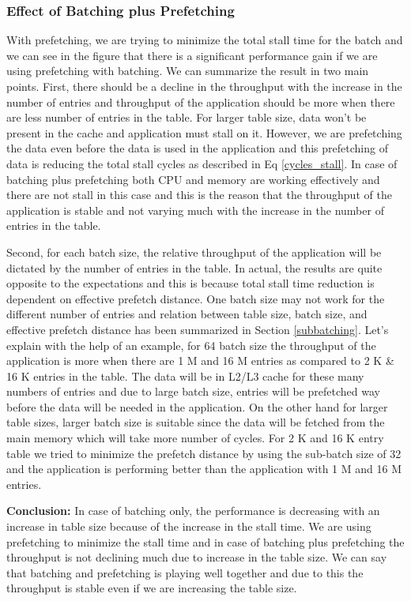 \subsubsection{Effect of Batching plus Prefetching}
\label{prefetchingsubsection}
With prefetching, we are trying to minimize the total stall time for the batch and we can see in the figure that there is a significant performance gain if we are using prefetching with batching. We can summarize the result in two main points. First, there should be a decline in the throughput with the increase in the number of entries and throughput of the application should be more when there are less number of entries in the table. For larger table size, data won't be present in the cache and application must stall on it. However, we are prefetching the data even before the data is used in the application and this prefetching of data is reducing the total stall cycles as described in Eq \ref{cycles_stall}. In case of batching plus prefetching both CPU and memory are working effectively and there are not stall in this case and this is the reason that the throughput of the application is stable and not varying much with the increase in the number of entries in the table.

Second, for each batch size, the relative throughput of the application will be dictated by the number of entries in the table. In actual, the results are quite opposite to the expectations and this is because total stall time reduction is dependent on effective prefetch distance. One batch size may not work for the different number of entries and relation between table size, batch size, and effective prefetch distance has been summarized in Section \ref{subbatching}. Let's explain with the help of an example, for 64 batch size the throughput of the application is more when there are 1 M and 16 M entries as compared to 2 K \& 16 K entries in the table. The data will be in L2/L3 cache for these many numbers of entries and due to large batch size, entries will be prefetched way before the data will be needed in the application. On the other hand for larger table sizes, larger batch size is suitable since the data will be fetched from the main memory which will take more number of cycles. For 2 K and 16 K entry table we tried to minimize the prefetch distance by using the sub-batch size of 32 and the application is performing better than the application with 1 M and 16 M entries. 

\textbf{Conclusion:} 
In case of batching only, the performance is decreasing with an increase in table size because of the increase in the stall time. We are using prefetching to minimize the stall time and in case of batching plus prefetching the throughput is not declining much due to increase in the table size. We can say that batching and prefetching is playing well together and due to this the throughput is stable even if we are increasing the table size.

